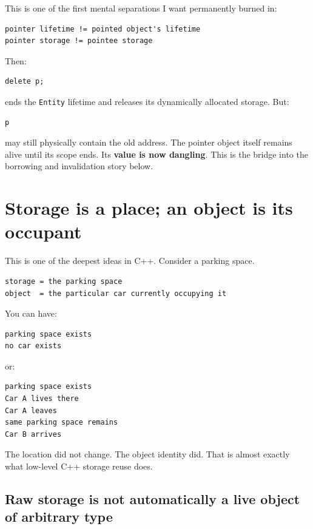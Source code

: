 This is one of the first mental separations I want permanently burned in:

\begin{verbatim}
pointer lifetime != pointed object's lifetime
pointer storage != pointee storage
\end{verbatim}

Then:

\begin{verbatim}
delete p;
\end{verbatim}

ends the \texttt{Entity} lifetime and releases its dynamically allocated storage. But:

\begin{verbatim}
p
\end{verbatim}

may still physically contain the old address. The pointer object itself remains alive until its scope ends. Its \textbf{value is now dangling}. This is the bridge into the borrowing and invalidation story below.

\section{Storage is a place; an object is its occupant}\label{01-foundations-i-ch002-storage-is-a-place-an-object-is-its-occupant}

This is one of the deepest ideas in C++. Consider a parking space.

\begin{verbatim}
storage = the parking space
object  = the particular car currently occupying it
\end{verbatim}

You can have:

\begin{verbatim}
parking space exists
no car exists
\end{verbatim}

or:

\begin{verbatim}
parking space exists
Car A lives there
Car A leaves
same parking space remains
Car B arrives
\end{verbatim}

The location did not change. The object identity did. That is almost exactly what low-level C++ storage reuse does.

\subsection{Raw storage is not automatically a live object of arbitrary type}\label{01-foundations-i-ch002-raw-storage-is-not-automatically-a-live-object-of-arbitrary-type}

